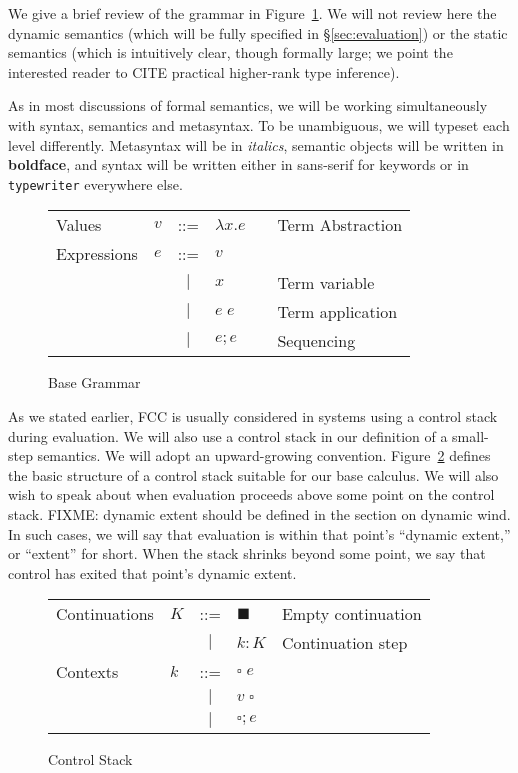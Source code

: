 \documentclass[11pt]{article}
\begin{document}
We give a brief review of the grammar in Figure~\ref{fig:startGrammar}.
We will not review here the dynamic semantics (which will be fully specified in \S\ref{sec:evaluation}) or the static semantics (which is intuitively clear, though formally large; we point the interested reader to CITE practical higher-rank type inference).

As in most discussions of formal semantics, we will be working simultaneously with syntax, semantics and metasyntax. To be unambiguous, we will typeset each level differently. Metasyntax will be in \textit{italics}, semantic objects will be written in \textbf{boldface}, and syntax will be written either in \textsf{sans-serif} for keywords or in \texttt{typewriter} everywhere else.

\begin{figure}[h]
\caption{Base Grammar}
\label{fig:startGrammar}

\begin{tabular}{llclll}
Values & $v$ & ::= & $\lambda x.e$ && Term Abstraction\\
Expressions & $e$ & ::= & $v$ && \\
& & $|$ & $x$ && Term variable \\
& & $|$ & $e\;e$ && Term application \\
& & $|$ & $e;e$ && Sequencing \\
\end{tabular}
\end{figure}

As we stated earlier, FCC is usually considered in systems using a control stack during evaluation.
We will also use a control stack in our definition of a small-step semantics.
We will adopt an upward-growing convention.
Figure~\ref{fig:controlStack} defines the basic structure of a control stack suitable for our base calculus.
We will also wish to speak about when evaluation proceeds above some point on the control stack.
FIXME: dynamic extent should be defined in the section on dynamic wind.
In such cases, we will say that evaluation is within that point's ``dynamic extent,'' or ``extent'' for short.
When the stack shrinks beyond some point, we say that control has exited that point's dynamic extent.

\begin{figure}[h!]
\caption{Control Stack}
\label{fig:controlStack}
\begin{tabular}{llcll}
Continuations & $K$ & ::= & $\blacksquare$ & Empty continuation \\
& & $|$ & $k:K$ & Continuation step \\
Contexts & $k$ & ::= & $\square\;e$\\
& & $|$ & $v\;\square$ \\
& & $|$ & $\square;e$ \\
\end{tabular}
\end{figure}
\end{document}
